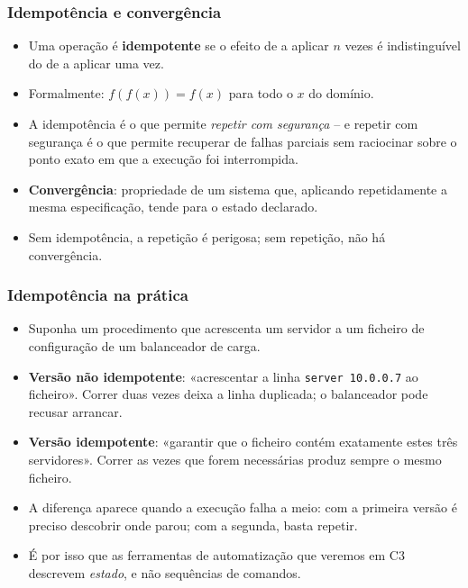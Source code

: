 \documentclass[aspectratio=169]{beamer}
\begin{document}
\begin{frame}
\frametitle{Idempotência e convergência}
\begin{itemize}
    \setlength\itemsep{0.35cm}
    \item Uma operação é \textbf{idempotente} se o efeito de a aplicar $n$ vezes é indistinguível do de a aplicar uma vez.
    \item Formalmente: $f(f(x)) = f(x)$ para todo o $x$ do domínio.
    \item A idempotência é o que permite \emph{repetir com segurança} -- e repetir com segurança é o que permite recuperar de falhas parciais sem raciocinar sobre o ponto exato em que a execução foi interrompida.
    \item \textbf{Convergência}: propriedade de um sistema que, aplicando repetidamente a mesma especificação, tende para o estado declarado.
    \item Sem idempotência, a repetição é perigosa; sem repetição, não há convergência.
\end{itemize}
\end{frame}

\begin{frame}
\frametitle{Idempotência na prática}
\begin{itemize}
    \setlength\itemsep{0.3cm}
    \item Suponha um procedimento que acrescenta um servidor a um ficheiro de configuração de um balanceador de carga.
    \item \textbf{Versão não idempotente}: «acrescentar a linha \texttt{server 10.0.0.7} ao ficheiro». Correr duas vezes deixa a linha duplicada; o balanceador pode recusar arrancar.
    \item \textbf{Versão idempotente}: «garantir que o ficheiro contém exatamente estes três servidores». Correr as vezes que forem necessárias produz sempre o mesmo ficheiro.
    \item A diferença aparece quando a execução falha a meio: com a primeira versão é preciso descobrir onde parou; com a segunda, basta repetir.
    \item É por isso que as ferramentas de automatização que veremos em C3 descrevem \emph{estado}, e não sequências de comandos.
\end{itemize}
\end{frame}
\end{document}
